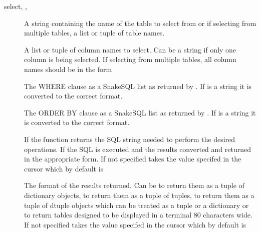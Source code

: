 \documentclass{howto}
\begin{document}
\begin{methoddesc}{select}{, , }
\begin{description}
\item[]
A string containing the name of the table to select from or if selecting from multiple tables, a list or tuple of table names.
\item[]
A list or tuple of column names to select. Can be a string if only one column is being selected. If selecting from multiple tables, all column names should be in the form 
\item[]
The WHERE clause as a SnakeSQL list as returned by . If  is a string it is converted to the correct format.
\item[]
The ORDER BY clause as a SnakeSQL list as returned by . If  is a string it is converted to the correct format.
\item[]
If  the function returns the SQL string needed to perform the desired operations. If  the SQL is executed and the results converted and returned in the appropriate form. If not specified takes the value specifed in the cursor which by default is 
\item[]
The format of the results returned. Can be  to return them as a tuple of dictionary objects,  to return them as a tuple of tuples,  to return them as a tuple of dtuple objects which can be treated as a tuple or a dictionary or  to return tables designed to be displayed in a terminal 80 characters wide. If not specified takes the value specifed in the cursor which by default is 
\end{description}
\end{methoddesc}
\end{document}
